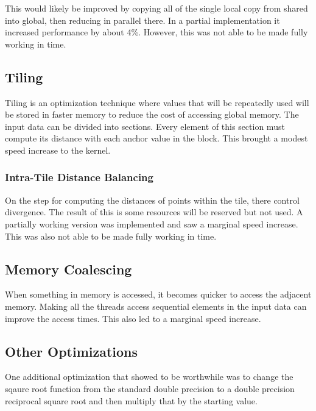 This would likely be improved by copying all of the single local copy from shared into global, then reducing in parallel there. In a partial implementation it increased performance by about 4\%. However, this was not able to be made fully working in time.


\subsection{Tiling}
\hspace{\parindent}Tiling is an optimization technique where values that will be repeatedly used will be stored in faster memory to reduce the cost of accessing global memory. The input data can be divided into sections. Every element of this section must compute its distance with each anchor value in the block. This brought a modest speed increase to the kernel.

\subsubsection{Intra-Tile Distance Balancing}
\hspace{\parindent}On the step for computing the distances of points within the tile, there control divergence. The result of this is some resources will be reserved but not used. A partially working version was implemented and saw a marginal speed increase. This was also not able to be made fully working in time.

\subsection{Memory Coalescing}
\hspace{\parindent}When something in memory is accessed, it becomes quicker to access the adjacent memory. Making all the threads access sequential elements in the input data can improve the access times. This also led to a marginal speed increase. 

\subsection{Other Optimizations}
\hspace{\parindent}One additional optimization that showed to be worthwhile was to change the sqaure root function from the standard double precision to a double precision reciprocal square root and then multiply that by the starting value. 
